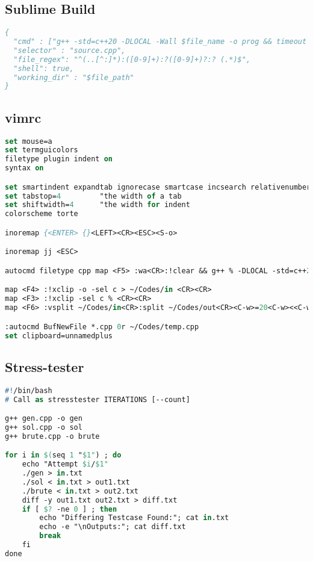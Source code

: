 \subsection*{Sublime Build}
\begin{lstlisting}[language= Pascal, commentstyle=\color{black}, numberstyle=\tiny\color{black}, keywordstyle=\color{black}, stringstyle=\color{black},
]
{
  "cmd" : ["g++ -std=c++20 -DLOCAL -Wall $file_name -o prog && timeout 5s ./prog<~/Codes/in>~/Codes/out"],
  "selector" : "source.cpp",
  "file_regex": "^(..[^:]*):([0-9]+):?([0-9]+)?:? (.*)$",
  "shell": true,
  "working_dir" : "$file_path"
}
\end{lstlisting}
\subsection*{vimrc}

\begin{lstlisting}[language= Pascal, commentstyle=\color{black}, numberstyle=\tiny\color{black}, keywordstyle=\color{black}, stringstyle=\color{black},
]
set mouse=a
set termguicolors
filetype plugin indent on
syntax on

set smartindent expandtab ignorecase smartcase incsearch relativenumber nowrap autoread splitright splitbelow
set tabstop=4         "the width of a tab
set shiftwidth=4      "the width for indent
colorscheme torte

inoremap {<ENTER> {}<LEFT><CR><ESC><S-o>

inoremap jj <ESC>  

autocmd filetype cpp map <F5> :wa<CR>:!clear && g++ % -DLOCAL -std=c++20 -Wall -Wextra -Wconversion -Wshadow -Wfloat-equal -o  ~/Codes/prog && (timeout 5 ~/Codes/prog < ~/Codes/in) >  ~/Codes/out<CR>

map <F4> :!xclip -o -sel c > ~/Codes/in <CR><CR>
map <F3> :!xclip -sel c % <CR><CR>
map <F6> :vsplit ~/Codes/in<CR>:split ~/Codes/out<CR><C-w>=20<C-w><<C-w><C-h>

:autocmd BufNewFile *.cpp 0r ~/Codes/temp.cpp
set clipboard=unnamedplus
\end{lstlisting}

\subsection*{Stress-tester}
\begin{lstlisting}[language= Pascal, commentstyle=\color{black}, numberstyle=\tiny\color{black}, keywordstyle=\color{black}, stringstyle=\color{black},
]
#!/bin/bash
# Call as stresstester ITERATIONS [--count]

g++ gen.cpp -o gen
g++ sol.cpp -o sol
g++ brute.cpp -o brute

for i in $(seq 1 "$1") ; do
    echo "Attempt $i/$1"
    ./gen > in.txt
    ./sol < in.txt > out1.txt
    ./brute < in.txt > out2.txt
    diff -y out1.txt out2.txt > diff.txt
    if [ $? -ne 0 ] ; then
        echo "Differing Testcase Found:"; cat in.txt
        echo -e "\nOutputs:"; cat diff.txt
        break
    fi
done
\end{lstlisting}
